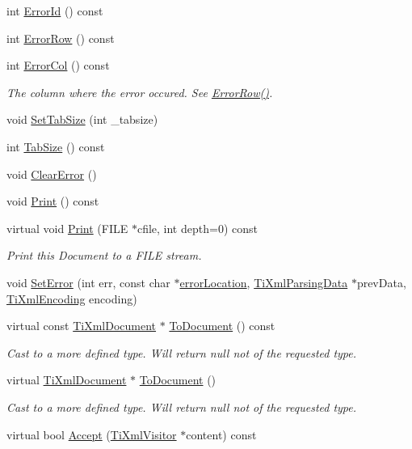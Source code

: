 \begin{DoxyCompactItemize}
int \hyperlink{class_ti_xml_document_af96fc2f3f9ec6422782bfe916c9e778f}{ErrorId} () const 
\item 
int \hyperlink{class_ti_xml_document_af30efc75e804aa2e92fb8be3a8cb676e}{ErrorRow} () const 
\item 
int \hyperlink{class_ti_xml_document_aa90bc630ee5203c6109ca5fad3323649}{ErrorCol} () const 
\begin{DoxyCompactList}\small\item\em The column where the error occured. See \hyperlink{class_ti_xml_document_af30efc75e804aa2e92fb8be3a8cb676e}{ErrorRow()}. \item\end{DoxyCompactList}\item 
void \hyperlink{class_ti_xml_document_a51dac56316f89b35bdb7d0d433ba988e}{SetTabSize} (int \_\-tabsize)
\item 
int \hyperlink{class_ti_xml_document_a612360241b85bad0826b2a9ae9cda561}{TabSize} () const 
\item 
void \hyperlink{class_ti_xml_document_ac66b8c28db86363315712a3574e87c35}{ClearError} ()
\item 
void \hyperlink{class_ti_xml_document_af08389ec70ee9b2de7f800e206a18510}{Print} () const 
\item 
virtual void \hyperlink{class_ti_xml_document_a7b1aea204fee266b70b9c105c8bf2ada}{Print} (FILE $\ast$cfile, int depth=0) const 
\begin{DoxyCompactList}\small\item\em Print this Document to a FILE stream. \item\end{DoxyCompactList}\item 
void \hyperlink{class_ti_xml_document_a735c23e318597b920c94eae77fa206de}{SetError} (int err, const char $\ast$\hyperlink{class_ti_xml_document_aa4030f989f1549f6b897147fc2851d1a}{errorLocation}, \hyperlink{class_ti_xml_parsing_data}{TiXmlParsingData} $\ast$prevData, \hyperlink{tinyxml_8h_a88d51847a13ee0f4b4d320d03d2c4d96}{TiXmlEncoding} encoding)
\item 
virtual const \hyperlink{class_ti_xml_document}{TiXmlDocument} $\ast$ \hyperlink{class_ti_xml_document_a1dc977bde3e4fe85a8eb9d88a35ef5a4}{ToDocument} () const 
\begin{DoxyCompactList}\small\item\em Cast to a more defined type. Will return null not of the requested type. \item\end{DoxyCompactList}\item 
virtual \hyperlink{class_ti_xml_document}{TiXmlDocument} $\ast$ \hyperlink{class_ti_xml_document_a1025d942a1f328fd742d545e37efdd42}{ToDocument} ()
\begin{DoxyCompactList}\small\item\em Cast to a more defined type. Will return null not of the requested type. \item\end{DoxyCompactList}\item 
virtual bool \hyperlink{class_ti_xml_document_a3daab2f472418ef66315750202f762ae}{Accept} (\hyperlink{class_ti_xml_visitor}{TiXmlVisitor} $\ast$content) const 
\end{DoxyCompactItemize}
